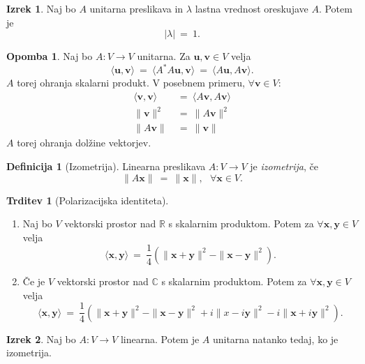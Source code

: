 \documentclass[11pt]{article}
\newcommand{\R}{\mathbb{R}}
\newcommand{\x}{\mathbf{x}}
\newcommand{\y}{\mathbf{y}}
\renewcommand{\u}{\mathbf{u}}
\newcommand{\vv}{\mathbf{v}}
\newcommand{\0}{\mathbf{0}}
\renewcommand{\sp}[2]{\langle #1, #2 \rangle}
\theoremstyle{definition}
\newtheorem{definicija}{Definicija}[section]
\theoremstyle{definition}
\newtheorem{trditev}{Trditev}[section]
\theoremstyle{definition}
\newtheorem{izrek}{Izrek}[section]
\theoremstyle{definition}
\newtheorem*{opomba}{Opomba}
\begin{document}
\begin{izrek}

Naj bo $A$ unitarna preslikava in $\lambda$ lastna vrednost oreskujave $A$. Potem je 
$$|\lambda| ~=~ 1.$$

\end{izrek}
\vspace{0.5cm}

\begin{opomba}

Naj bo $A: V \rightarrow V$ unitarna. Za $\u,\vv \in V$ velja
$$\sp{\u}{\vv} ~=~ \sp{A^*A\u}{\vv} ~=~ \sp{A\u}{A\vv}.$$
$A$ torej ohranja skalarni produkt. V posebnem primeru, $\forall \vv \in V$:
\begin{align*}
\sp{\vv}{\vv} ~&=~ \sp{A\vv}{A\vv} \\
\|\vv\|^2 ~&=~ \|A\vv\|^2 \\
\|A\vv\| ~&=~ \|\vv\|
\end{align*}
$A$ torej ohranja dolžine vektorjev.

\end{opomba}
\vspace{0.5cm}

\begin{definicija}[Izometrija]

Linearna preslikava $A: V \rightarrow V$ je \textit{izometrija}, če
$$\|A\x\| ~=~ \|\x\|, ~~~\forall \x \in V.$$

\end{definicija}
\vspace{0.5cm}

\begin{trditev}[Polarizacijska identiteta]
~
\begin{enumerate}

\item Naj bo $V$ vektorski prostor nad $\R$ s skalarnim produktom. Potem za $\forall \x,\y \in V$ velja
$$\sp{\x}{\y} ~=~ \frac{1}{4} \left(\|\x+\y\|^2 - \|\x-\y\|^2\right).$$

\item Če je $V$ vektorski prostor nad $\mathbb{C}$ s skalarnim produktom. Potem za $\forall \x,\y \in V$ velja
$$\sp{\x}{\y} ~=~ \frac{1}{4} \left(\|\x+\y\|^2 - \|\x-\y\|^2 + i\|x-i\y\|^2 - i\|\x+i\y\|^2\right).$$

\end{enumerate}

\end{trditev}
\vspace{0.5cm}

\begin{izrek}

Naj bo $A: V \rightarrow V$ linearna. Potem je $A$ unitarna natanko tedaj, ko je izometrija.

\end{izrek}
\vspace{0.5cm}
\end{document}

